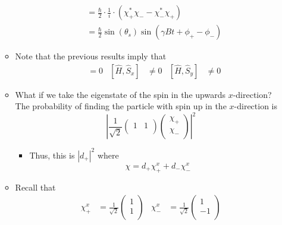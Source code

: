 \documentclass[../notes.tex]{subfiles}
\begin{document}
\begin{itemize}
\begin{itemize}
\begin{align*}
            &= \frac{\hbar}{2}\cdot\frac{1}{i}\cdot(\chi_+^*\chi_--\chi_-^*\chi_+)\\
            &= \frac{\hbar}{2}\sin(\theta_s)\sin(\gamma Bt+\phi_+-\phi_-)
        \end{align*}
        \item Note that the previous results imply that
        \begin{align*}
            [\hat{H},\hat{S}_z] &= 0&
            [\hat{H},\hat{S}_x] &\neq 0&
            [\hat{H},\hat{S}_y] &\neq 0
        \end{align*}
        \item What if we take the eigenstate of the spin in the upwards $x$-direction? The probability of finding the particle with spin up in the $x$-direction is
        \begin{equation*}
            \left|
                \frac{1}{\sqrt{2}}
                \begin{pmatrix}
                    1 & 1\\
                \end{pmatrix}
                \begin{pmatrix}
                    \chi_+\\
                    \chi_-\\
                \end{pmatrix}
            \right|^2
        \end{equation*}
        \begin{itemize}
            \item Thus, this is $|d_+|^2$ where
            \begin{equation*}
                \chi = d_+\chi_+^x+d_-\chi_-^x
            \end{equation*}
        \end{itemize}
        \item Recall that
        \begin{align*}
            \chi_+^x &= \frac{1}{\sqrt{2}}
            \begin{pmatrix}
                1\\
                1\\
            \end{pmatrix}&
            \chi_-^x &= \frac{1}{\sqrt{2}}
            \begin{pmatrix}
                1\\
                -1\\
            \end{pmatrix}

\end{align*}
\end{itemize}
\end{itemize}
\end{document}
